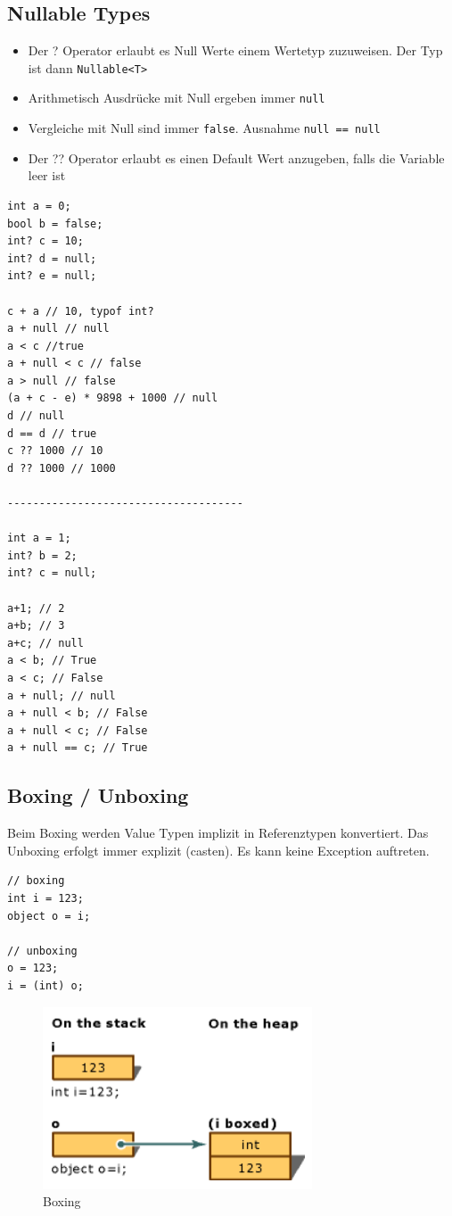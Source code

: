 \documentclass[
a4paper,
oneside,
10pt,
fleqn,
headsepline,
toc=listofnumbered, 
bibliography=totocnumbered]{scrartcl}
\begin{document}
\clearpage

\subsection{Nullable Types}
\begin{itemize}
	\item Der ? Operator erlaubt es Null Werte einem Wertetyp zuzuweisen. Der Typ ist dann \lstinline|Nullable<T>|
	\item Arithmetisch Ausdrücke mit Null ergeben immer \lstinline|null|
	\item Vergleiche mit Null sind immer \lstinline|false|. Ausnahme \lstinline|null == null|
	\item Der ?? Operator erlaubt es einen Default Wert anzugeben, falls die Variable leer ist
\end{itemize}
\begin{lstlisting}
int a = 0;
bool b = false;
int? c = 10;
int? d = null;
int? e = null;

c + a // 10, typof int?
a + null // null
a < c //true
a + null < c // false
a > null // false
(a + c - e) * 9898 + 1000 // null
d // null
d == d // true
c ?? 1000 // 10
d ?? 1000 // 1000

-------------------------------------

int a = 1;
int? b = 2;
int? c = null;

a+1; // 2
a+b; // 3
a+c; // null
a < b; // True
a < c; // False
a + null; // null
a + null < b; // False
a + null < c; // False
a + null == c; // True
\end{lstlisting}

\clearpage

\subsection{Boxing / Unboxing}

Beim Boxing werden Value Typen implizit in Referenztypen konvertiert. Das Unboxing erfolgt immer explizit (casten). Es kann keine Exception auftreten.
\begin{lstlisting}
// boxing
int i = 123;
object o = i;

// unboxing
o = 123;
i = (int) o;
\end{lstlisting}

\begin{figure}[h!]
\centering
\includegraphics[width=0.4\linewidth]{images/boxing}
\caption{Boxing}
\label{fig:boxing}
\end{figure}
\end{document}
